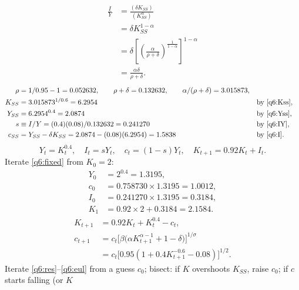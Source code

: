 \begin{sol}
\begin{align}
\frac IY &= \frac{(\delta K_{SS})}{(K_{SS}^\alpha)}\nonumber\\
&= \delta K_{SS}^{1-\alpha}\nonumber\\
&= \delta\left[\left(\frac{\alpha}{\rho+\delta}\right)^{\frac1{1-\alpha}}\right]^{1-\alpha}\nonumber\\
&= \frac{\alpha\delta}{\rho+\delta}. \label{q6:IY}
\end{align}
\begin{align*}
\rho &= 1/0.95-1=0.052632,\qquad \rho+\delta=0.132632,\qquad \alpha/(\rho+\delta)=3.015873,\\
K_{SS} &= 3.015873^{1/0.6}=6.2954 &&\text{by \eqref{q6:Kss}},\\
Y_{SS} &= 6.2954^{0.4}=2.0874 &&\text{by \eqref{q6:Yss}},\\
s &\equiv I/Y=(0.4)(0.08)/0.132632=0.241270 &&\text{by \eqref{q6:IY}},\\
c_{SS} &= Y_{SS}-\delta K_{SS}=2.0874-(0.08)(6.2954)=1.5838 &&\text{by \eqref{q6:I}}.
\end{align*}
\begin{equation}
Y_t=K_t^{0.4},\quad I_t=sY_t,\quad c_t=(1-s)Y_t,\quad K_{t+1}=0.92K_t+I_t. \label{q6:fixed}
\end{equation}
Iterate \eqref{q6:fixed} from $K_0=2$:
\begin{align*}
Y_0 &= 2^{0.4}=1.3195,\\
c_0 &= 0.758730\times1.3195=1.0012,\\
I_0 &= 0.241270\times1.3195=0.3184,\\
K_1 &= 0.92\times2+0.3184=2.1584.
\end{align*}
\begin{align}
K_{t+1} &= 0.92K_t+K_t^{0.4}-c_t, \label{q6:res}\\
c_{t+1} &= c_t\big[\beta\big(\alpha K_{t+1}^{\alpha-1}+1-\delta\big)\big]^{1/\sigma}\nonumber\\
&= c_t\big[0.95(1+0.4K_{t+1}^{-0.6}-0.08)\big]^{1/2}. \label{q6:eul}
\end{align}
Iterate \eqref{q6:res}--\eqref{q6:eul} from a guess $c_0$; bisect: if $K$ overshoots $K_{SS}$, raise $c_0$; if $c$ starts falling (or $K$

\end{sol}
